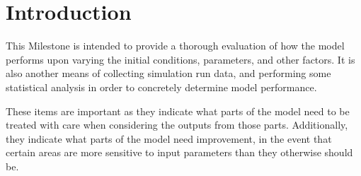 \section{Introduction}

This Milestone is intended to provide a thorough evaluation of how the model performs upon varying the initial conditions, parameters, and other factors. It is also another means of collecting simulation run data, and performing some statistical analysis in order to concretely determine model performance.

These items are important as they indicate what parts of the model need to be treated with care when considering the outputs from those parts. Additionally, they indicate what parts of the model need improvement, in the event that certain areas are more sensitive to input parameters than they otherwise should be.

